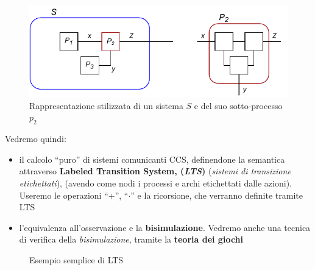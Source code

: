 \begin{itemize}
\begin{figure}[H]
  \includegraphics[scale = 0.9]{img/proc.pdf}
  \caption{Rappresentazione stilizzata di un sistema $S$ e del suo sotto-processo
    $p_2$}
  \label{fig:proc}
\end{figure}
  \end{itemize}

Vedremo quindi:
\begin{itemize}
  \item il calcolo ``puro'' di sistemi comunicanti CCS, definendone la semantica
  attraverso \textbf{Labeled Transition System, (\textit{LTS})} (\textit{sistemi
    di transizione etichettati}), (avendo come nodi i processi e archi
  etichettati dalle azioni). Useremo le operazioni ``+'', ``$\cdot$'' e la
  ricorsione, che verranno definite tramite LTS
  \item l'equivalenza all'osservazione e la \textbf{bisimulazione}. Vedremo
  anche una tecnica di verifica della \textit{bisimulazione}, tramite la
  \textbf{teoria dei giochi}
\end{itemize}
\begin{figure}
  \centering
  \caption{Esempio semplice di LTS}
  \label{fig:l}
\end{figure}
